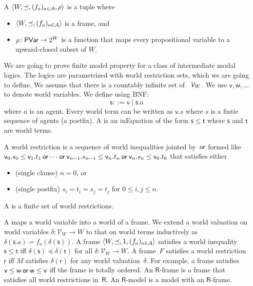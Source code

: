   \begin{definition}
   A  $\langle{W,\preceq, (f_a)_{a\in \mathcal A},\rho}\rangle$ is a tuple where
   \begin{itemize}
    \item $\langle{W,\preceq,(f_a)_{a\in \mathcal A}}\rangle$ is a frame, and
    \item $\rho\colon \mathsf{PVar}\rightarrow 2^W$ is a function that maps every
	  propositional variable to a upward-closed subset of $W\!$.
   \end{itemize}
  \end{definition}

  We are going to prove finite model property for a class of
  intermediate modal logics.  The logics are parametrized with
  world restriction sets,  which we are going to define.
  We assume that there is a countably infinite set of ~$\mathcal V_W$.
  We use $\mathsf v, \mathsf w,\ldots$ to denote world variables.
  We define  using BNF:
  \[
  \mathsf s::=\mathsf v\mid \mathsf s.a
  \]
  where $a$ is an agent.
  Every world term can be written as $\mathsf v.s$ where $s$ is a fintie sequence
  of agents (a postfix).
  A  is an inEquation of the form $\mathsf s\le
  \mathsf t$ where $\mathsf s$ and $\mathsf t$ are world terms.
  \begin{definition}
   A world restriction is a sequence of world inequalities jointed
   by~$\mathbin{\mathsf{or}}$ formed like
   $\mathsf v_0.s_0\le\mathsf v_1.t_1\mathbin{\mathsf{or}}\cdots\mathbin{\mathsf{or}}
   \mathsf v_{n-1}.s_{n-1}\le\mathsf v_n.t_n\mathbin{\mathsf{or}} \mathsf v_n.s_n\le\mathsf
   v_0.t_0$ that satisfies either
   \begin{itemize}
    \item (single clause) $n=0$, or
    \item (single postfix) $s_i = t_i = s_j = t_{j}$ for $0\le i,j\le n$.
   \end{itemize}
  \end{definition}
  A  is a finite set of world restrictions.

  A  maps a world variable into a world of a frame.
  We extend a world valuation on world variables
  $\delta\colon\mathcal V_W\rightarrow W$ to that on world terms
  inductively as $\delta(\mathsf s.a)=f_a(\delta(\mathsf s))$.
  A frame $\langle{W,\preceq, 1,(f_a)_{a\in\mathcal A}}\rangle$ satisfies a world inequality
  $\mathsf s\le\mathsf t$ iff $\delta(\mathsf s)\preceq \delta(\mathsf t)$
  for all $\delta\colon\mathcal V_W\rightarrow W$.
  A frame~$F$ satisfies a world restriction $\mathsf r$
  iff $M$ satisfies $\delta(\mathsf r)$ for any world valuation~$\delta$.
  For example, a frame satisfies $\mathsf v\le \mathsf w\mathbin{\mathsf{or}}\mathsf
  w\le\mathsf v$ iff the frame is totally ordered.
  An $\mathsf R$-frame is a frame that
  satisfies all world restrictions in~$\mathsf R$.
  An $\mathsf R$-model is a model with an $\mathsf R$-frame.


